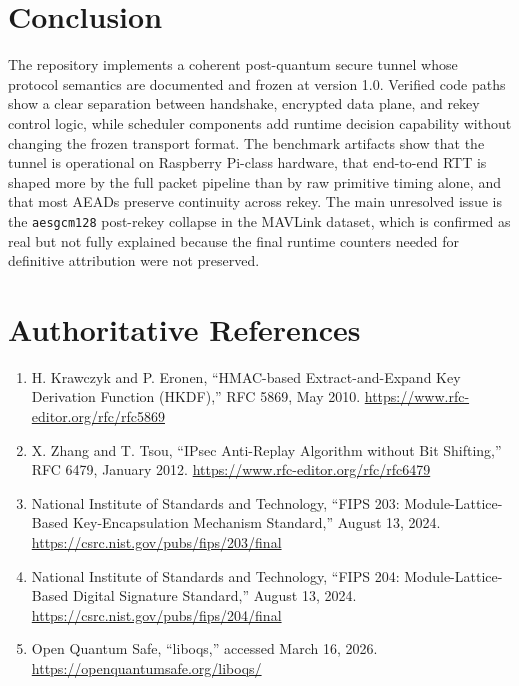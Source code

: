 \documentclass[11pt]{article}
\begin{document}
\section{Conclusion}
The repository implements a coherent post-quantum secure tunnel whose protocol semantics are documented and frozen at version 1.0. Verified code paths show a clear separation between handshake, encrypted data plane, and rekey control logic, while scheduler components add runtime decision capability without changing the frozen transport format. The benchmark artifacts show that the tunnel is operational on Raspberry Pi-class hardware, that end-to-end RTT is shaped more by the full packet pipeline than by raw primitive timing alone, and that most AEADs preserve continuity across rekey. The main unresolved issue is the \texttt{aesgcm128} post-rekey collapse in the MAVLink dataset, which is confirmed as real but not fully explained because the final runtime counters needed for definitive attribution were not preserved.

\section*{Authoritative References}
\begin{enumerate}[leftmargin=*]
\item H. Krawczyk and P. Eronen, ``HMAC-based Extract-and-Expand Key Derivation Function (HKDF),'' RFC 5869, May 2010. \url{https://www.rfc-editor.org/rfc/rfc5869}
\item X. Zhang and T. Tsou, ``IPsec Anti-Replay Algorithm without Bit Shifting,'' RFC 6479, January 2012. \url{https://www.rfc-editor.org/rfc/rfc6479}
\item National Institute of Standards and Technology, ``FIPS 203: Module-Lattice-Based Key-Encapsulation Mechanism Standard,'' August 13, 2024. \url{https://csrc.nist.gov/pubs/fips/203/final}
\item National Institute of Standards and Technology, ``FIPS 204: Module-Lattice-Based Digital Signature Standard,'' August 13, 2024. \url{https://csrc.nist.gov/pubs/fips/204/final}
\item Open Quantum Safe, ``liboqs,'' accessed March 16, 2026. \url{https://openquantumsafe.org/liboqs/}
\end{enumerate}
\end{document}
